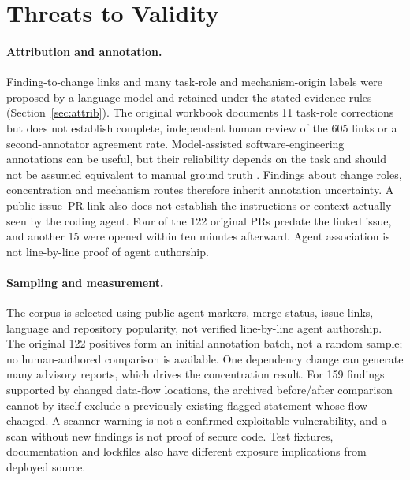\documentclass[acmsmall,screen,nonacm]{acmart}
\begin{document}
\section{Threats to Validity}\label{sec:threats}

\paragraph{Attribution and annotation.} Finding-to-change links and many task-role and mechanism-origin labels were proposed by a language model and retained under the stated evidence rules (Section~\ref{sec:attrib}). The original workbook documents 11 task-role corrections but does not establish complete, independent human review of the 605 links or a second-annotator agreement rate. Model-assisted software-engineering annotations can be useful, but their reliability depends on the task and should not be assumed equivalent to manual ground truth \cite{b40}. Findings about change roles, concentration and mechanism routes therefore inherit annotation uncertainty. A public issue--PR link also does not establish the instructions or context actually seen by the coding agent. Four of the 122 original PRs predate the linked issue, and another 15 were opened within ten minutes afterward. Agent association is not line-by-line proof of agent authorship.

\paragraph{Sampling and measurement.} The corpus is selected using public agent markers, merge status, issue links, language and repository popularity, not verified line-by-line agent authorship. The original 122 positives form an initial annotation batch, not a random sample; no human-authored comparison is available. One dependency change can generate many advisory reports, which drives the concentration result. For 159 findings supported by changed data-flow locations, the archived before/after comparison cannot by itself exclude a previously existing flagged statement whose flow changed. A scanner warning is not a confirmed exploitable vulnerability, and a scan without new findings is not proof of secure code. Test fixtures, documentation and lockfiles also have different exposure implications from deployed source.
\end{document}
